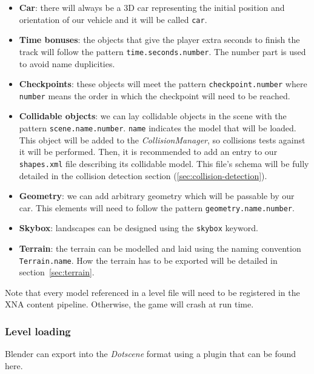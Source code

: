\begin{itemize}
	\item \textbf{Car}: there will always be a 3D car representing the initial position
	and orientation of our vehicle and it will be called \texttt{car}.
	\item \textbf{Time bonuses}: the objects that give the player extra seconds to finish
	the track will follow the pattern \texttt{time.seconds.number}. The number part is used
	to avoid name duplicities.
	\item \textbf{Checkpoints}: these objects will meet the pattern \texttt{checkpoint.number}
	where \texttt{number} means the order in which the checkpoint will need to be reached.
	\item \textbf{Collidable objects}: we can lay collidable objects in the scene with
	the pattern \texttt{scene.name.number}. \texttt{name} indicates the model that will
	be loaded. This object will be added to the \textit{CollisionManager}, so
	collisions tests against it will be performed. Then, it is recommended
	to add an entry to our \texttt{shapes.xml} file describing its collidable model.
	This file's schema will be fully detailed in the collision detection section (\ref{sec:collision-detection}).
	\item \textbf{Geometry}: we can add arbitrary geometry which will be passable by our car.
	This elements will need to follow the pattern \texttt{geometry.name.number}.
	\item \textbf{Skybox}: landscapes can be designed using the \texttt{skybox} keyword.
	\item \textbf{Terrain}: the terrain can be modelled and laid using the naming convention
	\texttt{Terrain.name}. How the terrain has to be exported will be detailed in 
	section~\ref{sec:terrain}.
\end{itemize}

Note that every model referenced in a level file will need to be registered in the
XNA content pipeline. Otherwise, the game will crash at run time.


\subsubsection{Level loading}

Blender can export into the \textit{Dotscene} format using a plugin that can be found here.\\

